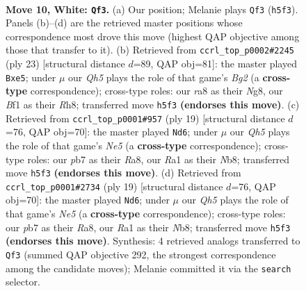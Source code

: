 \documentclass[11pt]{article}
\begin{document}
\clearpage

\begin{figure}[p]\centering
\begin{subfigure}{0.46\textwidth}\centering
\resizebox{\linewidth}{!}{%
\newchessgame
\chessboard[
  setfen={rnb2rk1/pppnqppp/4p3/3pP2Q/3P1P2/2N5/PPP3PP/R3KBNR w KQ - 5 10},
  showmover=false,
  pgfstyle=straightmove, color=movearrow, markmove={h5-f3}
]}
\caption{}
\end{subfigure}\hfill
\begin{subfigure}{0.46\textwidth}\centering
\resizebox{\linewidth}{!}{%
\newchessgame
\chessboard[
  setfen={r3k1nr/1pq2pbp/p1n1p1p1/2PpP3/NP6/8/P1PNQPPP/1RB1K2R b Kkq - 0 12},
  showmover=false,
  pgfstyle=straightmove, color=movearrow, markmove={g7-e5}
]}
\caption{}
\end{subfigure}
\\[4pt]
\begin{subfigure}{0.46\textwidth}\centering
\resizebox{\linewidth}{!}{%
\newchessgame
\chessboard[
  setfen={rnbqk2r/1p3ppp/2p1p3/p7/P1pPn3/5NP1/1P2PPBP/RNQ1K2R b KQkq - 2 10},
  showmover=false,
  pgfstyle=straightmove, color=movearrow, markmove={e4-d6}
]}
\caption{}
\end{subfigure}\hfill
\begin{subfigure}{0.46\textwidth}\centering
\resizebox{\linewidth}{!}{%
\newchessgame
\chessboard[
  setfen={rnbqk2r/1p3ppp/2p1p3/p7/P1pPn3/5NP1/1P2PPBP/RNQ1K2R b KQkq - 2 10},
  showmover=false,
  pgfstyle=straightmove, color=movearrow, markmove={e4-d6}
]}
\caption{}
\end{subfigure}
\caption{\textbf{Move 10, White: \texttt{Qf3}.} (a) Our position; Melanie plays \texttt{Qf3} (\texttt{h5f3}). Panels (b)--(d) are the retrieved master positions whose correspondence most drove this move (highest QAP objective among those that transfer to it). (b) Retrieved from \texttt{ccrl\_top\_p0002\#2245} (ply 23) [structural distance $d$=89, QAP obj=81]: the master played \texttt{Bxe5}; under $\mu$ our \emph{Qh5} plays the role of that game's \emph{Bg2} (a \textbf{cross-type} correspondence); cross-type roles: our \emph{r}a8 as their \emph{N}g8, our \emph{B}f1 as their \emph{R}h8; transferred move \texttt{h5f3} \textbf{(endorses this move)}. (c) Retrieved from \texttt{ccrl\_top\_p0001\#957} (ply 19) [structural distance $d$=76, QAP obj=70]: the master played \texttt{Nd6}; under $\mu$ our \emph{Qh5} plays the role of that game's \emph{Ne5} (a \textbf{cross-type} correspondence); cross-type roles: our \emph{p}b7 as their \emph{R}a8, our \emph{R}a1 as their \emph{N}b8; transferred move \texttt{h5f3} \textbf{(endorses this move)}. (d) Retrieved from \texttt{ccrl\_top\_p0001\#2734} (ply 19) [structural distance $d$=76, QAP obj=70]: the master played \texttt{Nd6}; under $\mu$ our \emph{Qh5} plays the role of that game's \emph{Ne5} (a \textbf{cross-type} correspondence); cross-type roles: our \emph{p}b7 as their \emph{R}a8, our \emph{R}a1 as their \emph{N}b8; transferred move \texttt{h5f3} \textbf{(endorses this move)}. Synthesis: 4 retrieved analogs transferred to \texttt{Qf3} (summed QAP objective 292, the strongest correspondence among the candidate moves); Melanie committed it via the \texttt{search} selector.}
\label{fig:thought-m18}
\end{figure}
\end{document}
